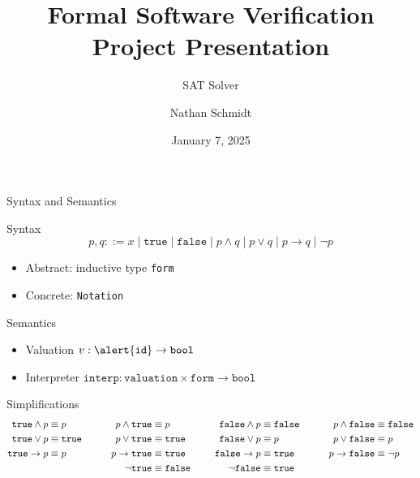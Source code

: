 \documentclass[aspectratio=169,xcolor=dvipsnames]{beamer}
\title{Formal Software Verification Project Presentation}
\subtitle{SAT Solver}
\date{January 7, 2025}
\author{Nathan Schmidt}
\institute{Aarhus University}
\begin{document}
    \maketitle

    \begin{frame}{Syntax and Semantics}
        \begin{block}{Syntax}
            $$p, q ::= x\;|\;\texttt{true}\;|\;\texttt{false}\;|\;p \land q\;|\;p \lor q\;|\;p \rightarrow q\;|\;\neg p$$
            \vspace*{-20pt}
            \begin{itemize}
                \item Abstract: inductive type \texttt{form}
                \item Concrete: \texttt{Notation}
            \end{itemize}
        \end{block}

        \pause
        
        \begin{block}{Semantics}
            \begin{itemize}
                \item Valuation $v : \alert{\texttt{id}} \rightarrow \texttt{bool}$
                \item Interpreter $\texttt{interp} : \texttt{valuation} \times \texttt{form} \rightarrow \texttt{bool}$
            \end{itemize}
        \end{block}
    \end{frame}

    \begin{frame}{Simplifications}
        \small\begin{alignat*}{4}
            \texttt{true} \land p &\equiv p &p \land \texttt{true} &\equiv p &\texttt{false} \land p &\equiv \texttt{false}\hspace*{20pt}&p \land \texttt{false} &\equiv \texttt{false} \\
            \texttt{true} \lor p &\equiv \texttt{true}\hspace*{20pt}&p \lor \texttt{true} &\equiv \texttt{true}\hspace*{20pt}&\texttt{false} \lor p &\equiv p &p \lor \texttt{false} &\equiv p \\
            \texttt{true} \rightarrow p &\equiv p &p \rightarrow \texttt{true} &\equiv \texttt{true} &\texttt{false} \rightarrow p &\equiv \texttt{true} &p \rightarrow \texttt{false} &\equiv \neg p \\
            &&\neg \texttt{true} &\equiv \texttt{false} &\neg \texttt{false} &\equiv \texttt{true}
        \end{alignat*}
    \end{frame}
\end{document}

